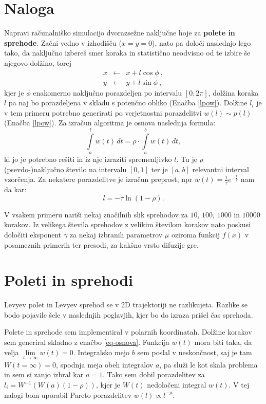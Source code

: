 \documentclass[a4paper, 12pt, slovene]{article}
\begin{document}
\section{Naloga}
Napravi računalniško simulacijo dvorazsežne naključne hoje za \textbf{polete in sprehode}.  Začni vedno v izhodišču ($x=y=0$), nato pa določi naslednjo lego tako, da naključno izbereš smer koraka in statistično neodvisno od te izbire še njegovo dolžino, torej
\begin{eqnarray*}
x &\leftarrow& x + l \cos\phi \>, \\
y &\leftarrow& y + l \sin\phi \>,
\end{eqnarray*}
kjer je $\phi$ enakomerno naključno porazdeljen po intervalu $[0,2\pi]$, dolžina koraka $l$ pa naj bo porazdeljena
v skladu s potenčno obliko (Enačba \eqref{lpow}). Dolžine $l_i$ je v tem primeru potrebno generirati po verjetnostni
porazdelitvi $w(l)\sim p(l)$ (Enačba \eqref{lpow}). Za izra\v cun algoritma je osnova naslednja formula:
\begin{equation}
\int\limits_{a}^{l} w(t)\,  dt = \rho \cdot \int\limits_{a}^{b}  w(t)\, dt,
\label{eq-osnova}
\end{equation}
ki jo je potrebno re\v siti in iz nje izraziti spremenljivko $l$. Tu je $\rho$ (psevdo-)naključno število na intervalu $[0,1]$ ter je $[a,b]$ relevantni interval vzorčenja. Za nekatere porazdelitve je izra\v cun preprost, npr $w(t)=\frac{1}{\tau} e^{-\frac{t}{\tau}}$ nam da kar:
\begin{equation}
l=-\tau \ln(1-\rho).
\end{equation}

V vsakem primeru nariši nekaj značilnih slik sprehodov za $10$, $100$, $1000$ in $10000$ korakov. Iz velikega števila sprehodov z velikim številom korakov nato poskusi določiti eksponent $\gamma$ za nekaj izbranih parametrov $\mu$ oziroma funkcij $f(x)$ v posameznih primerih ter presodi, za kakšno vrsto difuzije gre.



\section{Poleti in sprehodi}
Levyev polet in Levyev sprehod se v 2D trajektoriji ne razlikujeta. Razlike se bodo pojavile šele v naslednjih poglavjih, kjer bo do izraza prišel čas sprehoda. \par\vspace{5mm}

Polete in sprehode sem implementiral v polarnih koordinatah. Dolžine korakov sem generiral skladno z enačbo \eqref{eq-osnova}. Funkcija $w(t)$ mora biti taka, da velja $\lim\limits_{t\rightarrow \infty} w(t) = 0$. Integralsko  mejo $b$ sem poslal v neskončnost, saj je tam $W(t=\infty) = 0$, spodnja meja obeh integralov $a$, pa služi le kot skala problema in sem si zanjo izbral kar $a = 1$. Tako sem dobil porazdelitev za $l_i = W^{-1}(W(a)(1-\rho))$, kjer je $W(t)$ nedoločeni integral $w(t)$. V tej nalogi bom uporabil Pareto porazdelitev $w(l) \propto l^{-\mu}$. \par\vspace{5mm}
\end{document}
